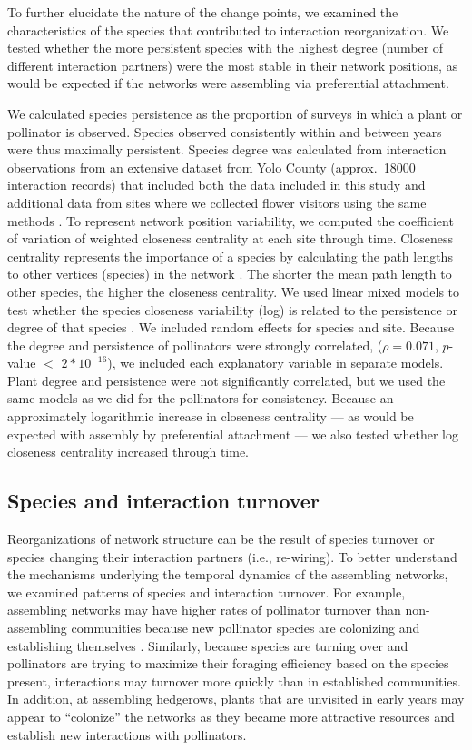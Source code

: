 \documentclass[12pt]{article}
\begin{document}
To further elucidate the nature of the change points, we examined the
characteristics of the species that contributed to interaction
reorganization. We tested whether the more persistent species with the
highest degree (number of different interaction partners) were the
most stable in their network positions, as would be expected if the
networks were assembling via preferential attachment.

We calculated species persistence as the proportion of surveys in
which a plant or pollinator is observed. Species observed consistently
within and between years were thus maximally persistent. Species
degree was calculated from interaction observations from an extensive
dataset from Yolo County (approx.~18000 interaction records) that
included both the data included in this study and additional data from
sites where we collected flower visitors using the same methods
\citep{mgonigle-2015-x, ponisio2015farm}. To represent network
position variability, we computed the coefficient of variation of
weighted closeness centrality \citep{freeman1978centrality} at each
site through time. Closeness centrality represents the importance of a
species by calculating the path lengths to other vertices (species) in
the network \citep{freeman1978centrality}. The shorter the mean path
length to other species, the higher the closeness centrality. We used
linear mixed models to test whether the species closeness variability
(log) is related to the persistence or degree of that species
\citep{lme4, lmetest}. We included random effects for species and
site. Because the degree and persistence of pollinators were strongly
correlated, ($\rho = 0.071$, $p$-value $<$ $2*10^{-16}$), we included
each explanatory variable in separate models. Plant degree and
persistence were not significantly correlated, but we used the same
models as we did for the pollinators for consistency.  Because an
approximately logarithmic increase in closeness centrality --- as
would be expected with assembly by preferential attachment --- we also
tested whether log closeness centrality increased through time.

\subsection*{Species and interaction turnover}

Reorganizations of network structure can be the result of species
turnover or species changing their interaction partners (i.e.,
re-wiring). To better understand the mechanisms underlying the
temporal dynamics of the assembling networks, we examined patterns of
species and interaction turnover. For example, assembling networks may
have higher rates of pollinator turnover than non-assembling
communities because new pollinator species are colonizing and
establishing themselves \citep{mgonigle-2015-x}. Similarly, because
species are turning over and pollinators are trying to maximize their
foraging efficiency based on the species present, interactions may
turnover more quickly than in established communities. In addition, at
assembling hedgerows, plants that are unvisited in early years may
appear to ``colonize'' the networks as they became more attractive
resources and establish new interactions with pollinators.
\end{document}

